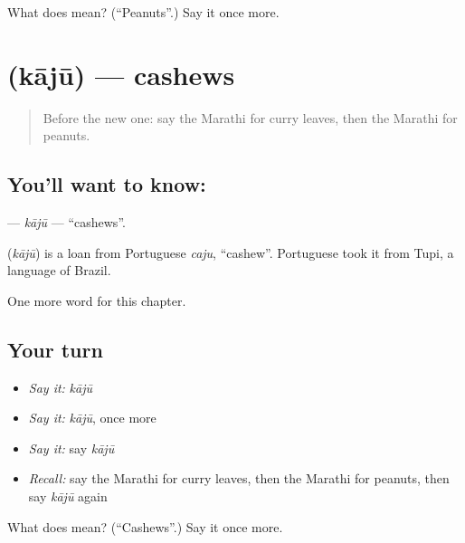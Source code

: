 \begin{tcolorbox}[breakable,colback=teal!4,colframe=teal!35!black,title={Before you move on}]
What does  mean? (\textquotedblleft{}Peanuts\textquotedblright{}.) Say it once more.
\end{tcolorbox}
\section[\texorpdfstring{\mr{काजू} (kājū)}{काजू (kājū)}]{ (kājū) — cashews}

\label{lesson:MR-C244-kaju}



\begin{quote}
Before the new one: say the Marathi for curry leaves, then the Marathi for peanuts.
\end{quote}

\subsection*{You'll want to know: }
\textbf{} — \emph{kājū} — \textquotedblleft{}cashews\textquotedblright{}.

\begin{cousinweb}
\textbf{} (\emph{kājū}) is a loan from Portuguese \emph{caju}, \textquotedblleft{}cashew\textquotedblright{}. Portuguese took it from Tupi, a language of Brazil.
\end{cousinweb}

\begin{grammarlens}[title={What you've built}]
One more word for this chapter.
\end{grammarlens}

\subsection*{Your turn}
\begin{itemize}
\raggedright
  \item \emph{Say it:} \emph{kājū}
  \item \emph{Say it:} \emph{kājū}, once more
  \item \emph{Say it:} say \emph{kājū}
  \item \emph{Recall:} say the Marathi for curry leaves, then the Marathi for peanuts, then say \emph{kājū} again
\end{itemize}

\begin{tcolorbox}[breakable,colback=teal!4,colframe=teal!35!black,title={Before you move on}]
What does  mean? (\textquotedblleft{}Cashews\textquotedblright{}.) Say it once more.
\end{tcolorbox}
